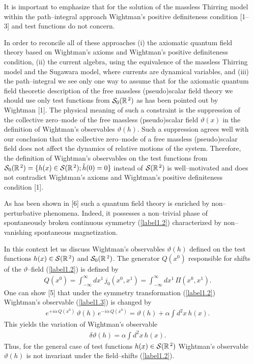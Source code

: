 \documentclass[a4paper,12pt] {article}
\begin{document}
It is important to emphasize that for the solution of the massless
Thirring model within the path--integral approach Wightman's positive
definiteness condition [1--3] and test functions do not concern.

In order to reconcile all of these approaches (i) the axiomatic
quantum field theory based on Wightman's axioms and Wightman's
positive definiteness condition, (ii) the current algebra, using the
equivalence of the massless Thirring model and the Sugawara model,
where currents are dynamical variables, and (iii) the path--integral
we see only one way to assume that for the axiomatic quantum field
theoretic description of the free massless (pseudo)scalar field theory
we should use only test functions from ${\cal S}_0(\mathbb{R}^{\,2})$
as has been pointed out by Wightman [1]. The physical meaning of such
a constraint is the suppression of the collective zero--mode of the
free massless (pseudo)scalar field $\vartheta(x)$ in the definition of
Wightman's observables $\vartheta(h)$. Such a suppression agrees well
with our conclusion that the collective zero--mode of a free massless
(pseudo)scalar field does not affect the dynamics of relative motions
of the system.  Therefore, the definition of Wightman's observables on
the test functions from ${\cal S}_0(\mathbb{R}^{\,2}) = \{h(x) \in
{\cal S}(\mathbb{R}^{\,2}); \tilde{h}(0) = 0\}$ instead of ${\cal
S}(\mathbb{R}^{\,2})$ is well--motivated and does not contradict
Wightman's axioms and Wightman's positive definiteness condition [1].

As has been shown in [6] such a quantum field theory is enriched by
non--perturbative phenomena. Indeed, it possesses a non--trivial phase
of spontaneously broken continuous symmetry (\ref{label1.2})
characterized by non--vanishing spontaneous magnetization.

In this context let us discuss Wightman's observables $\vartheta(h)$
defined on the test functions $h(x) \in {\cal S}(\mathbb{R}^{\,2})$
and ${\cal S}_0(\mathbb{R}^{\,2})$. The generator $Q(x^0)$ responsible
for shifts of the $\vartheta$--field (\ref{label1.2}) is defined by
%
\begin{eqnarray}\label{label1.25}
Q(x^0) = \int^{\infty}_{-\infty}dx^1\,j_0(x^0,x^1) =
\int^{\infty}_{-\infty}dx^1\,\Pi(x^0,x^1).
\end{eqnarray}
%
One can show [5] that under the symmetry transformation
(\ref{label1.2}) Wightman's observable (\ref{label1.3}) is changed by
%
\begin{eqnarray}\label{label1.26}
e^{\textstyle +i\alpha\,Q(x^0)}\,\vartheta(h)\,e^{\textstyle
-i\alpha\,Q(x^0)} = \vartheta(h) + \alpha\int d^2x\,h(x).
\end{eqnarray}
%
This yields the variation of Wightman's observable
%
\begin{eqnarray}\label{label1.27}
\delta \vartheta(h) = \alpha\int d^2x\,h(x).
\end{eqnarray}
%
Thus, for the general case of test functions $h(x) \in {\cal
S}(\mathbb{R}^{\,2})$ Wightman's observable $\vartheta(h)$ is not
invariant under the field--shifts (\ref{label1.2}).
\end{document}
